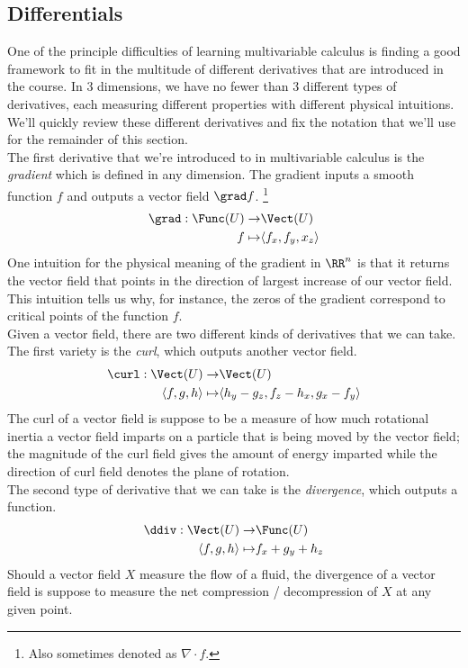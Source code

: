 \subsection{Differentials}
One of the principle difficulties of learning multivariable calculus is finding a good framework to fit in the multitude of different derivatives that are introduced in the course. In 3 dimensions, we have no fewer than 3 different types of derivatives, each measuring different properties with different physical intuitions. We'll quickly review these different derivatives and fix the notation that we'll use for the remainder of this section. \\
The first derivative that we're introduced to in multivariable calculus is the \emph{gradient} which is defined in any dimension. The gradient inputs a smooth function $f$ and outputs a vector field $\grad f$. \footnote{Also sometimes denoted as $\nabla\cdot f.$}
\begin{align*}
\grad: \Func(U)\to& \Vect(U)\\
f\mapsto &\langle f_x, f_y, x_z\rangle 
\end{align*}
One intuition for the physical meaning of the gradient in $\RR^n$ is that it returns the vector field that points in the direction of largest increase of our vector field. This intuition tells us why, for instance, the zeros of the gradient correspond to critical points of the function $f$. \\
Given a vector field, there are two different kinds of derivatives that we can take. The first variety is the \emph{curl}, which outputs another vector field. 
\begin{align*}
\curl: \Vect(U)\to&\Vect(U)\\
\langle f, g, h\rangle \mapsto & \langle h_y-g_z, f_z-h_x, g_x-f_y\rangle
\end{align*}
The curl of a vector field is suppose to be a measure of how much rotational inertia a vector field imparts on a particle that is being moved by the vector field; the magnitude of the curl field gives the amount of energy imparted while the direction of curl field denotes the plane of rotation. \\
The second type of derivative that we can take is the \emph{divergence}, which outputs a function. 
\begin{align*}
\ddiv: \Vect(U)\to&\Func(U)\\
\langle f, g, h\rangle \mapsto& f_x+g_y+h_z
\end{align*}
Should a vector field $X$ measure the flow of a fluid, the divergence of a vector field is suppose to measure the net compression / decompression of $X$ at any given point. \\
